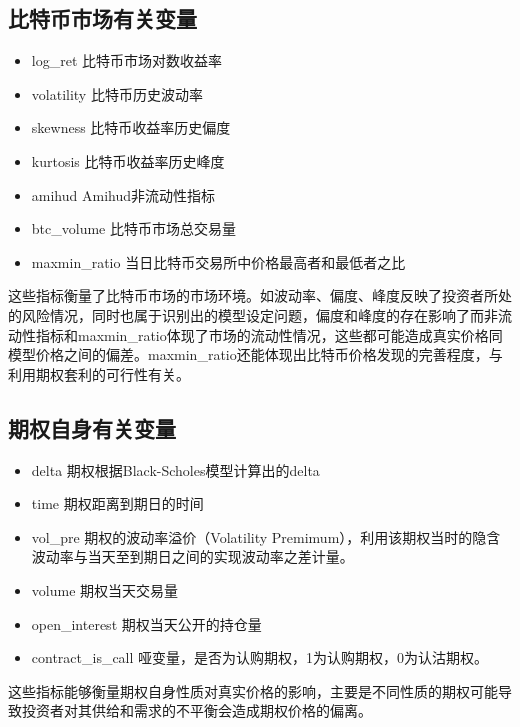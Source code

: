     \subsection{比特币市场有关变量}
    \begin{itemize}
        \item log\_ret 比特币市场对数收益率
        \item volatility 比特币历史波动率
        \item skewness 比特币收益率历史偏度
        \item kurtosis 比特币收益率历史峰度
        \item amihud Amihud非流动性指标
        \item btc\_volume 比特币市场总交易量
        \item maxmin\_ratio 当日比特币交易所中价格最高者和最低者之比
    \end{itemize}
    
    这些指标衡量了比特币市场的市场环境。如波动率、偏度、峰度反映了投资者所处的风险情况，同时也属于识别出的模型设定问题，偏度和峰度的存在影响了而非流动性指标和maxmin\_ratio体现了市场的流动性情况，这些都可能造成真实价格同模型价格之间的偏差。maxmin\_ratio还能体现出比特币价格发现的完善程度，与利用期权套利的可行性有关。
    \subsection{期权自身有关变量}
    \begin{itemize}
        \item delta 期权根据Black-Scholes模型计算出的delta
        \item time 期权距离到期日的时间
        \item vol\_pre 期权的波动率溢价（Volatility Premimum），利用该期权当时的隐含波动率与当天至到期日之间的实现波动率之差计量。
        \item volume 期权当天交易量                                     
        
        \item open\_interest 期权当天公开的持仓量
        \item contract\_is\_call 哑变量，是否为认购期权，1为认购期权，0为认沽期权。 
    \end{itemize}
    这些指标能够衡量期权自身性质对真实价格的影响，主要是不同性质的期权可能导致投资者对其供给和需求的不平衡会造成期权价格的偏离。

    
